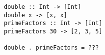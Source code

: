\begin{verbatim}
double :: Int -> [Int]
double x -> [x, x]
primeFactors :: Int -> [Int]
primeFactors 30 -> [2, 3, 5]

double . primeFactors = ???
\end{verbatim}
